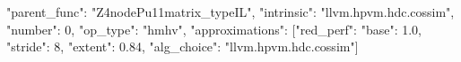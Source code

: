 "parent_func": "Z4nodePu11matrix_typeIL", 
"intrinsic": "llvm.hpvm.hdc.cossim", 
"number": 0, "op_type": "hmhv", 
"approximations": 
[{"red_perf":  {"base": 1.0, "stride": 8, "extent": 0.84}}, 
 {"alg_choice": "llvm.hpvm.hdc.cossim"}]